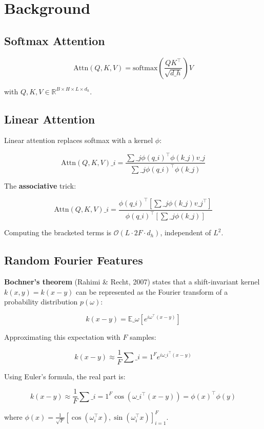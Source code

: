 \section{Background}

\subsection{Softmax Attention}

\[
\text{Attn}(Q, K, V) = \text{softmax}\!\left(\frac{Q K^\top}{\sqrt{d\_h}}\right) V
\]

with $Q, K, V \in \mathbb{R}^{B \times H \times L \times d_h}$.

\subsection{Linear Attention}

Linear attention replaces softmax with a kernel $\phi$:

\[
\text{Attn}(Q, K, V)\_i = \frac{\sum\_j \phi(q\_i)^\top \phi(k\_j) v\_j}{\sum\_j \phi(q\_i)^\top \phi(k\_j)}
\]

The \textbf{associative} trick:

\[
\text{Attn}(Q, K, V)\_i = \frac{\phi(q\_i)^\top \left[ \sum\_j \phi(k\_j) v\_j^\top \right]}{\phi(q\_i)^\top \left[ \sum\_j \phi(k\_j) \right]}
\]

Computing the bracketed terms is $\mathcal{O}(L \cdot 2F \cdot d_h)$, independent of $L^2$.

\subsection{Random Fourier Features}

\textbf{Bochner's theorem} (Rahimi \& Recht, 2007) states that a shift-invariant 
kernel $k(x, y) = k(x - y)$ can be represented as the Fourier transform of 
a probability distribution $p(\omega)$:

\[
k(x - y) = \mathbb{E}\_\omega [e^{i \omega^\top (x - y)}]
\]

Approximating this expectation with $F$ samples:

\[
k(x - y) \approx \frac{1}{F} \sum\_{i=1}^{F} e^{i \omega\_i^\top (x - y)}
\]

Using Euler's formula, the real part is:

\[
k(x - y) \approx \frac{1}{F} \sum\_{i=1}^{F} \cos(\omega\_i^\top (x - y))
= \phi(x)^\top \phi(y)
\]

where $\phi(x) = \frac{1}{\sqrt{F}} [\cos(\omega_i^\top x), \sin(\omega_i^\top x)]_{i=1}^F$.

